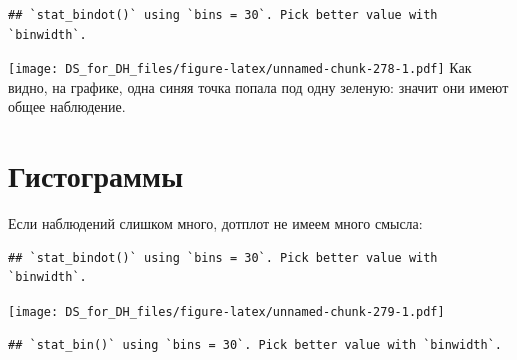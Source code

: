 \documentclass[
]{book}
\newenvironment{Shaded}{\begin{snugshade}}{\end{snugshade}}
\newcommand{\CommentTok}[1]{\textcolor[rgb]{0.56,0.35,0.01}{\textit{#1}}}
\newcommand{\DataTypeTok}[1]{\textcolor[rgb]{0.13,0.29,0.53}{#1}}
\newcommand{\KeywordTok}[1]{\textcolor[rgb]{0.13,0.29,0.53}{\textbf{#1}}}
\newcommand{\NormalTok}[1]{#1}
\newcommand{\OperatorTok}[1]{\textcolor[rgb]{0.81,0.36,0.00}{\textbf{#1}}}
\newcommand{\OtherTok}[1]{\textcolor[rgb]{0.56,0.35,0.01}{#1}}
\newcommand{\StringTok}[1]{\textcolor[rgb]{0.31,0.60,0.02}{#1}}
\begin{document}
\begin{verbatim}
## `stat_bindot()` using `bins = 30`. Pick better value with `binwidth`.
\end{verbatim}

\texttt{[image: DS\_for\_DH\_files/figure-latex/unnamed-chunk-278-1.pdf]}
Как видно, на графике, одна синяя точка попала под одну зеленую: значит они имеют общее наблюдение.

\hypertarget{ux433ux438ux441ux442ux43eux433ux440ux430ux43cux43cux44b}{%
\section{Гистограммы}\label{ux433ux438ux441ux442ux43eux433ux440ux430ux43cux43cux44b}}

Если наблюдений слишком много, дотплот не имеем много смысла:

\begin{Shaded}
\end{Shaded}

\begin{verbatim}
## `stat_bindot()` using `bins = 30`. Pick better value with `binwidth`.
\end{verbatim}

\texttt{[image: DS\_for\_DH\_files/figure-latex/unnamed-chunk-279-1.pdf]}

\begin{Shaded}
\end{Shaded}

\begin{verbatim}
## `stat_bin()` using `bins = 30`. Pick better value with `binwidth`.
\end{verbatim}
\end{document}

